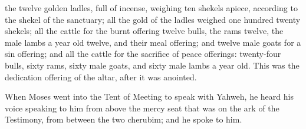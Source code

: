 {the twelve golden ladles, full of incense, weighing ten shekels apiece, according to the shekel of the sanctuary; all the gold of the ladles weighed one hundred twenty shekels;
all the cattle for the burnt offering twelve bulls, the rams twelve, the male lambs a year old twelve, and their meal offering; and twelve male goats for a sin offering;
and all the cattle for the sacrifice of peace offerings: twenty-four bulls, sixty rams, sixty male goats, and sixty male lambs a year old. This was the dedication offering of the altar, after it was anointed.
\par }{\PP {}When Moses went into the Tent of Meeting to speak with Yahweh, he heard his voice speaking to him from above the mercy seat that was on the ark of the Testimony, from between the two cherubim; and he spoke to him.

}
